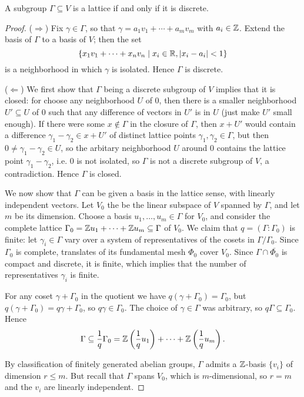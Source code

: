 \begin{prop}[Neukirch 4.2]
	A subgroup $\Gamma\subseteq V$ is a lattice if and only if it is discrete.
\end{prop}
\begin{proof}
	($\Longrightarrow$) Fix $\gamma\in\Gamma$, so that $\gamma=a_1v_1+\cdots+a_mv_m$ with $a_i\in\mathbb{Z}$. Extend the basis of $\Gamma$ to a basis of $V$; then the set
	\[
		\{x_1v_1 + \cdots + x_nv_n \mid x_i\in\mathbb{R}, |x_i-a_i|<1\}
	\]
	is a neighborhood in which $\gamma$ is isolated. Hence $\Gamma$ is discrete.

	($\Longleftarrow$) We first show that $\Gamma$ being a discrete subgroup of $V$ implies that it is closed: for choose any neighborhood $U$ of 0, then there is a smaller neighborhood $U'\subseteq U$ of 0 such that any difference of vectors in $U'$ is in $U$ (just make $U'$ small enough). If there were some $x\notin\Gamma$ in the closure of $\Gamma$, then $x+U'$ would contain a difference $\gamma_1-\gamma_2\in x+U'$ of distinct lattice points $\gamma_1,\gamma_2\in\Gamma$, but then $0\neq \gamma_1-\gamma_2\in U$, so the arbitary neighborhood $U$ around 0 contains the lattice point $\gamma_1-\gamma_2$, i.e. 0 is not isolated, so $\Gamma$ is not a discrete subgroup of $V$, a contradiction. Hence $\Gamma$ is closed.

	We now show that $\Gamma$ can be given a basis in the lattice sense, with linearly independent vectors. Let $V_0$ the be the linear subspace of $V$ spanned by $\Gamma$, and let $m$ be its dimension. Choose a basis $u_1,\dots,u_m\in\Gamma$ for $V_0$, and consider the complete lattice $\Gamma_0 = \mathbb{Z} u_1 + \cdots + \mathbb{Z} u_m \subseteq\Gamma$ of $V_0$. We claim that $q=(\Gamma:\Gamma_0)$ is finite: let $\gamma_i\in\Gamma$ vary over a system of representatives of the cosets in $\Gamma/\Gamma_0$. Since $\Gamma_0$ is complete, translates of its fundamental mesh $\Phi_0$ cover $V_0$. Since $\Gamma\cap\overline{\Phi_0}$ is compact and discrete, it is finite, which implies that the number of representatives $\gamma_i$ is finite.

	For any coset $\gamma+\Gamma_0$ in the quotient we have $q(\gamma+\Gamma_0)=\Gamma_0$, but $q(\gamma+\Gamma_0)=q\gamma+\Gamma_0$, so $q\gamma\in\Gamma_0$. The choice of $\gamma\in\Gamma$ was arbitrary, so $q\Gamma\subseteq\Gamma_0$. Hence
	\[
		\Gamma\subseteq\frac{1}{q}\Gamma_0 = \mathbb{Z}\left(\frac{1}{q}u_1\right) + \cdots + \mathbb{Z}\left(\frac{1}{q}u_m\right).
	\]

	By classification of finitely generated abelian groups, $\Gamma$ admits a $\mathbb{Z}$-basis $\{v_i\}$ of dimension $r\leq m$. But recall that $\Gamma$ spans $V_0$, which is $m$-dimensional, so $r=m$ and the $v_i$ are linearly independent.
\end{proof}

